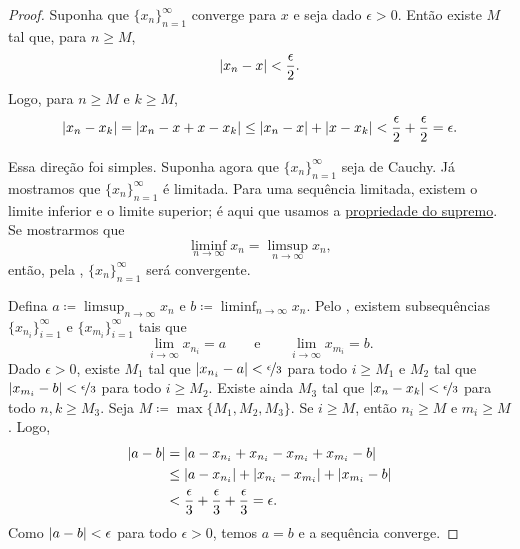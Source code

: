\begin{proof}
Suponha que $\{ x_n \}_{n=1}^\infty$ converge para $x$
e seja dado $\epsilon > 0$.
Então existe $M$ tal que, para $n \geq M$,
\begin{equation*}
\lvert {x_n - x} \rvert < \frac{\epsilon}{2} .
\end{equation*}
Logo, para $n \geq M$ e $k \geq M$,
\begin{equation*}
\lvert {x_n - x_k} \rvert = 
\lvert {x_n - x + x - x_k} \rvert
\leq \lvert {x_n-x} \rvert + \lvert {x-x_k} \rvert < \frac{\epsilon}{2} + \frac{\epsilon}{2} =
\epsilon .
\end{equation*}

Essa direção foi simples. Suponha agora que $\{ x_n \}_{n=1}^\infty$ seja de Cauchy.
Já mostramos que $\{ x_n \}_{n=1}^\infty$ é limitada.
Para uma sequência limitada, existem o limite inferior e o limite superior; é aqui
que usamos a
\hyperref[defn:lub]{propriedade do supremo}.
Se mostrarmos que
\begin{equation*}
\liminf_{n\to \infty} x_n = \limsup_{n\to\infty} x_n ,
\end{equation*}
então, pela , $\{ x_n \}_{n=1}^\infty$ será convergente.


Defina $a \coloneqq \limsup_{n\to\infty} x_n$ e
$b \coloneqq \liminf_{n\to\infty} x_n$.
Pelo , existem subsequências
$\{ x_{n_i} \}_{i=1}^\infty$ e
$\{ x_{m_i} \}_{i=1}^\infty$ tais que
\begin{equation*}
\lim_{i\to\infty} x_{n_i} = a
\qquad \text{e} \qquad
\lim_{i\to\infty} x_{m_i} = b.
\end{equation*}
Dado $\epsilon > 0$,
existe $M_1$ tal que
$\lvert {x_{n_i} - a} \rvert < \nicefrac{\epsilon}{3}$ para todo $i \geq M_1$
e $M_2$ tal que
$\lvert {x_{m_i} - b} \rvert < \nicefrac{\epsilon}{3}$ para todo $i \geq M_2$.
Existe ainda $M_3$
tal que
$\lvert {x_n-x_k} \rvert < \nicefrac{\epsilon}{3}$
para todo $n,k \geq M_3$.
Seja $M \coloneqq \max \{ M_1, M_2, M_3 \}$.
Se $i \geq M$, então $n_i \geq M$ e $m_i \geq M$. Logo,
\begin{equation*}
\begin{split}
\lvert {a-b} \rvert & =
\lvert {a-x_{n_i}+x_{n_i}
-x_{m_i}+x_{m_i}
-b} \rvert \\
& \leq
\lvert {a-x_{n_i}} \rvert
+ \lvert {x_{n_i} -x_{m_i}} \rvert
+ \lvert {x_{m_i} -b} \rvert \\
& <
\frac{\epsilon}{3}
+
\frac{\epsilon}{3}
+
\frac{\epsilon}{3}
= \epsilon .
\end{split}
\end{equation*}
Como $\lvert {a-b} \rvert < \epsilon$ para todo $\epsilon > 0$, temos $a=b$ e
a sequência converge.
\end{proof}

